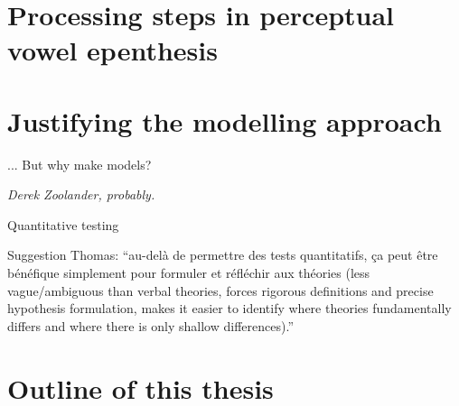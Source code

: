 \section{Processing steps in perceptual vowel epenthesis}
\section{Justifying the modelling approach}
\epigraph{... But why make models?}{\textit{Derek Zoolander, probably.}}
Quantitative testing $~$

Suggestion Thomas: ``au-delà de permettre des tests quantitatifs, ça peut être bénéfique simplement pour formuler et réfléchir aux théories (less vague/ambiguous than verbal theories, forces rigorous definitions and precise hypothesis formulation, makes it easier to identify where theories fundamentally differs and where there is only shallow differences).''
\section{Outline of this thesis}


